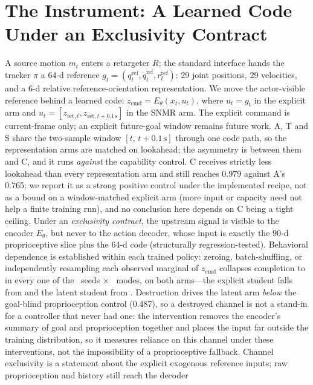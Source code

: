 \documentclass[conference]{IEEEtran}
\newcommand{\zcmd}{\ensuremath{z_{\mathrm{cmd}}}}
\newcommand{\snmr}{SNMR}
\newcommand{\EExplicitAmb}{0.979}
\newcommand{\ESnmrAmb}{0.765}
\newcommand{\EProprioGeneral}{0.487}
\begin{document}
\section{The Instrument: A Learned Code Under an Exclusivity Contract}
\label{sec:interface}
A source motion $m_t$ enters a retargeter $R$; the standard interface hands the tracker
$\pi$ a 64-d reference $g_t=(q^{\mathrm{ref}}_t,\dot q^{\mathrm{ref}}_t,
r^{\mathrm{ref}}_t)$: 29 joint positions, 29 velocities, and a 6-d relative reference-orientation
representation. We move the actor-visible reference behind a learned code:
$\zcmd = E_\theta(x_t,u_t)$, where $u_t=g_t$ in the explicit arm and
$u_t=[z_{\mathrm{ret},t},z_{\mathrm{ret},t+0.1\,\mathrm{s}}]$ in the \snmr{} arm.
The explicit command is current-frame only; an explicit future-goal window remains
future work.  A, T and S share the two-sample window $[t,\,t{+}0.1\,\mathrm{s}]$ through
one code path, so the representation arms are matched on lookahead; the asymmetry is between
them and C, and it runs \emph{against} the capability control.  C receives strictly less
lookahead than every representation arm and still reaches \EExplicitAmb{} against A's
\ESnmrAmb{}; we report it as a strong positive control under the implemented recipe, not as
a bound on a window-matched explicit arm (more input or capacity need not help a finite
training run), and no conclusion here depends on C being a tight ceiling. Under an \emph{exclusivity contract}, the upstream signal is visible to the
encoder $E_\theta$, but never to the action decoder, whose input is exactly the
90-d proprioceptive slice plus the 64-d code (structurally regression-tested).  Behavioral
dependence is established within each trained policy: zeroing, batch-shuffling, or
independently resampling each observed marginal of \zcmd{} collapses completion to
\EDestroyCompletion{} in every one of the \EDestroySeeds{}~seeds $\times$
\EDestroyModes{}~modes, on both arms---the explicit student falls from
\EDestroyBaselineCompletion{} and the latent student from
\EDestroySnmrBaselineCompletion{}.  Destruction drives the latent arm \emph{below} the
goal-blind proprioception control (\EProprioGeneral{}), so a destroyed channel is not a
stand-in for a controller that never had one: the intervention removes the encoder's summary
of goal and proprioception together and places the input far outside the training
distribution, so it measures reliance on this channel under these interventions, not the
impossibility of a proprioceptive fallback.  Channel exclusivity is a statement about the
explicit exogenous reference inputs; raw proprioception and history still reach the decoder
\end{document}
